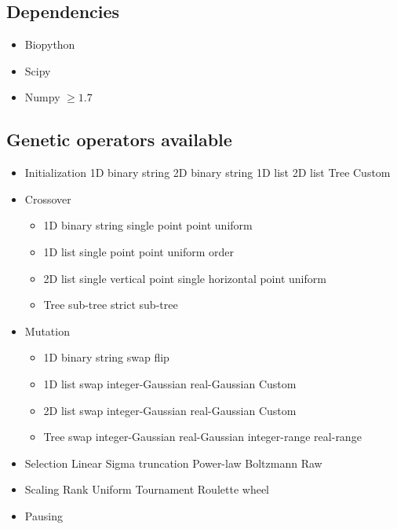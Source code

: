 \documentclass{article}
\begin{document}
\subsection{Dependencies}
\begin{itemize}
    \item Biopython
    \item Scipy
    \item Numpy $\geq 1.7$
\end{itemize}
\subsection{Genetic operators available}
\begin{itemize}
    \item Initialization 
    \subitem 1D binary string 
    \subitem 2D binary string
    \subitem 1D list
    \subitem 2D list
    \subitem Tree
    \subitem Custom
    \item Crossover
    \begin{itemize}
    \item  1D binary string
    \subitem single point
     point
    \subitem uniform
    \item 1D list 
    \subitem single point
     point
    \subitem uniform 
    \subitem order
    \item 2D list  
    \subitem single vertical point
    \subitem single horizontal point
    \subitem uniform
    \item Tree 
    \subitem sub-tree
    \subitem strict sub-tree
    \end{itemize}
    \item Mutation 
    \begin{itemize}
    \item  1D binary string
    \subitem swap
    \subitem flip
    \item 1D list 
    \subitem swap
    \subitem integer-Gaussian 
    \subitem real-Gaussian
    \subitem Custom
    \item 2D list  
    \subitem swap
    \subitem integer-Gaussian 
    \subitem real-Gaussian
    \subitem Custom
    \item Tree 
    \subitem swap
    \subitem integer-Gaussian 
    \subitem real-Gaussian
    \subitem integer-range 
    \subitem real-range
    \end{itemize}
    \item Selection 
    \subitem Linear
    \subitem Sigma truncation
    \subitem Power-law
    \subitem Boltzmann
    \subitem Raw
    \item Scaling 
    \subitem Rank
    \subitem Uniform
    \subitem Tournament
    \subitem Roulette wheel
    \item Pausing
\end{itemize}
\end{document}
